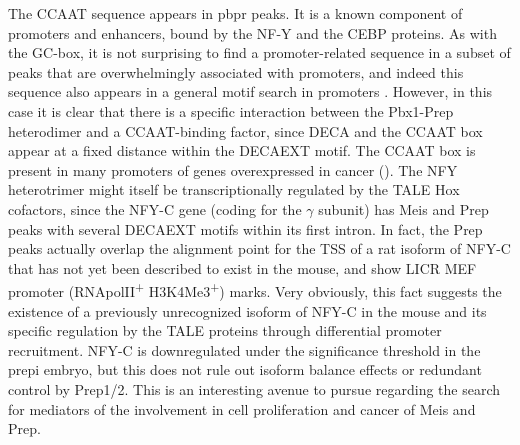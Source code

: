 The CCAAT sequence appears in \ac{pbpr} peaks. It is a known component of promoters and enhancers, bound by the NF-Y and the CEBP proteins. As with the GC-box, it is not surprising to find a promoter-related sequence in a subset of peaks that are overwhelmingly associated with promoters, and indeed this sequence also appears in a general motif search in promoters \parencite{Hartmann2013}. However, in this case it is clear that there is a specific interaction between the Pbx1-Prep heterodimer and a CCAAT-binding factor, since \ac{DECA} and the CCAAT box appear at a fixed distance within the \ac{DECAEXT} motif. The CCAAT box is present in many promoters of genes overexpressed in cancer (\cite{Dolfini2013}). The NFY heterotrimer might itself be transcriptionally regulated by the \ac{TALE} Hox cofactors, since the NFY-C gene (coding for the $\gamma$ subunit) has Meis and Prep peaks with several \ac{DECAEXT} motifs within its first intron. In fact, the Prep peaks actually overlap the alignment point for the \ac{TSS} of a rat isoform of NFY-C that has not yet been described to exist in the mouse, and show LICR \ac{MEF} promoter (RNApolII\textsuperscript{+} H3K4Me3\textsuperscript{+}) marks. Very obviously, this fact suggests the existence of a previously unrecognized isoform of NFY-C in the mouse and its specific regulation by the \ac{TALE} proteins through differential promoter recruitment. NFY-C is downregulated under the significance threshold in the \ac{prepi} embryo, but this does not rule out isoform balance effects or redundant control by Prep1/2. This is an interesting avenue to pursue regarding the search for mediators of the involvement in cell proliferation and cancer of Meis and Prep.


 

